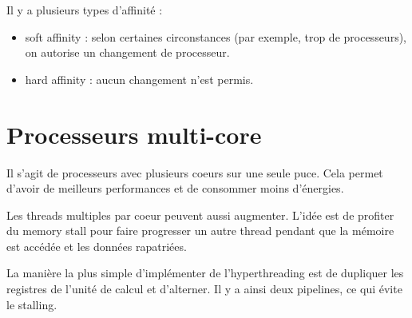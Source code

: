 
Il y a plusieurs types d'affinité :

\begin{itemize}
	\item soft affinity : selon certaines circonstances (par exemple, trop de processeurs), on autorise un changement de processeur.
	\item hard affinity : aucun changement n'est permis.
\end{itemize}

\section{Processeurs multi-core}

Il s'agit de processeurs avec plusieurs coeurs sur une seule puce. Cela permet d'avoir de meilleurs performances et de consommer moins d'énergies.

Les threads multiples par coeur peuvent aussi augmenter. L'idée est de profiter du memory stall pour faire progresser un autre thread pendant que la mémoire est accédée et les données rapatriées.

La manière la plus simple d'implémenter de l'hyperthreading est de dupliquer les registres de l'unité de calcul et d'alterner. Il y a ainsi deux pipelines, ce qui évite le stalling.
